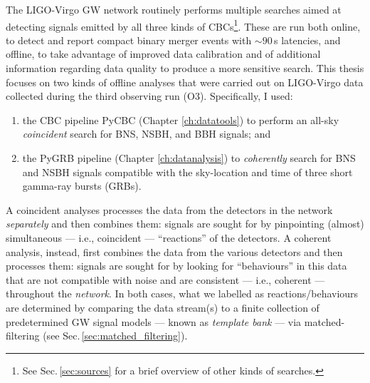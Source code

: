 \documentclass[binding=0.6cm, LaM]{sapthesis}
\begin{document}
	The LIGO-Virgo GW network routinely performs multiple searches aimed at detecting signals 
	emitted by all three kinds of CBCs\footnote{See Sec.\,\ref{sec:sources} for a brief overview of other kinds of searches.}.
        These are run both online, to detect and report compact binary merger events 
	with $\sim 90\,$s latencies, and offline, to take advantage of improved data calibration 	
	and of additional information regarding data quality to produce a more sensitive search.
	This thesis focuses on two kinds of offline analyses that were carried out on LIGO-Virgo data collected during the third observing run (O3).
        Specifically, I used:
        \begin{enumerate}
          \item the CBC pipeline {\ttfamily PyCBC} (Chapter \ref{ch:datatools}) 
	to perform an all-sky \emph{coincident} search for BNS, NSBH, and BBH signals; and
        \item the {\ttfamily PyGRB} pipeline
	(Chapter \ref{ch:datanalysis}) to \emph{coherently} search for BNS and NSBH signals compatible 
	with the sky-location and time of three short gamma-ray bursts (GRBs).
        \end{enumerate}
        A coincident analyses processes the data from the detectors in the network \emph{separately} and 
	then combines them: signals are sought for by pinpointing (almost) simultaneous 
	--- i.e., coincident --- ``reactions'' of the detectors.
        A coherent analysis, instead, first combines the data from the various detectors and 
	then processes them: signals are sought for by looking for ``behaviours'' in this data that 
	are not compatible with noise and are consistent --- i.e., coherent --- throughout the \emph{network}.  
	In both cases, what we labelled as reactions/behaviours are determined by comparing the data stream(s) 
	to a finite collection of predetermined GW signal models --- known as \emph{template bank} --- 
	via matched-filtering (see Sec.\,\ref{sec:matched_filtering}).
\end{document}
